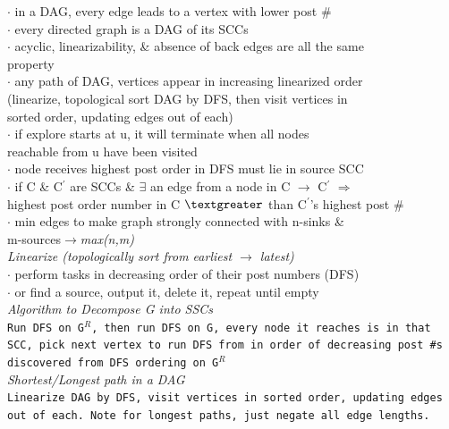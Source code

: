 \documentclass[10pt,landscape]{article}
\begin{document}
\begin{multicols}{3}
{\hspace{5pt} $\cdot$ in a DAG, every edge leads to a vertex with lower post \#\\
\hspace{5pt} $\cdot$ every directed graph is a DAG of its SCCs\\
\hspace{5pt} $\cdot$ acyclic, linearizability, \& absence of back edges are all the same \\\hspace{12pt}property\\
\hspace{5pt} $\cdot$ any path of DAG, vertices appear in increasing linearized order\\\hspace{10pt}(linearize, topological sort DAG by DFS, then visit vertices in \\\hspace{10pt}sorted order, updating edges out of each)\\
\hspace{5pt} $\cdot$ if explore starts at u, it will terminate when all nodes \\\hspace{10pt}reachable from u have been visited\\
\hspace{5pt} $\cdot$ node receives highest post order in DFS must lie in source SCC\\
\hspace{5pt} $\cdot$ if C \& C$^{'}$ are SCCs \& $\exists$ an edge from a node in C $\rightarrow$ C$^{'}$ $\Rightarrow$ \\\hspace{12pt}highest post order number in C $\textgreater$ than C$^{'}$'s highest post \#\\
\hspace{5pt} $\cdot$ min edges to make graph strongly connected with n-sinks \& \\\hspace{12pt}m-sources$\rightarrow${\it max(n,m)}\\
{\it Linearize (topologically sort from earliest $\rightarrow$ latest)}\\
\hspace{5pt} $\cdot$ perform tasks in decreasing order of their post numbers (DFS)\\
\hspace{5pt} $\cdot$ or find a source, output it, delete it, repeat until empty\\
{\it Algorithm to Decompose G into SSCs}\\
{\addtolength{\leftskip}{4mm}
\texttt{Run DFS on G$^{R}$, then run DFS on G, every node it reaches is in that SCC, pick next vertex to run DFS from in order of decreasing post \#s discovered from DFS ordering on G$^{R}$}\\}
{\it Shortest/Longest path in a DAG}\\
{\addtolength{\leftskip}{4mm}
\texttt{Linearize DAG by DFS, visit vertices in sorted order, updating edges out of each. Note for longest paths, just negate all edge lengths.}\\}}


\end{multicols}
\end{document}
